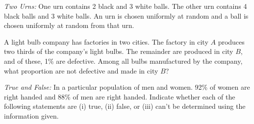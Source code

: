 \documentclass[addpoints,12pt]{exam}
\begin{document}
\begin{questions}
\vspace{1.2in}

\question[3]
\emph{Two Urns:} One urn contains 2 black and 3 white balls. The other urn contains 4 black balls and 3 white balls. An urn is chosen uniformly at random and a ball is chosen uniformly at random from that urn.
\noaddpoints
{}
\addpoints

\question[2] A light bulb company has factories in two cities. The factory in city $A$ produces two thirds of the company's light bulbs. The remainder are produced in city $B$, and of these, 1\% are defective. Among all bulbs manufactured by the company, what proportion are not defective and made in city $B$?

\vspace{2in}

\question[4]
\emph{True and False:} In a particular population of men and women. 92\% of women are right handed and 88\% of men are right handed. Indicate whether each of the following statements are (i) true, (ii) false, or (iii) can't be determined using the information given.
\noaddpoints
{}
\end{questions}
\end{document}
